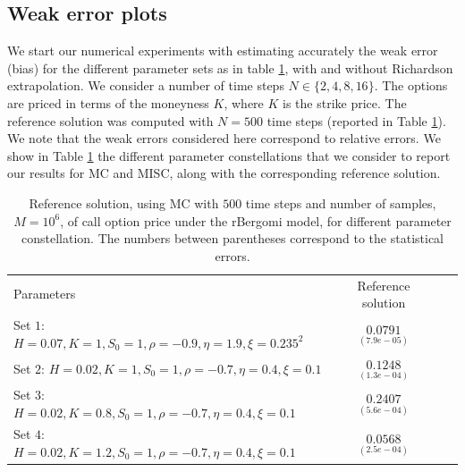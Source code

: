 
\subsection{Weak error plots} \label{sec:Weak error plots_no_change}

We start our numerical experiments with estimating accurately the weak error (bias)  for the different parameter sets as in table \ref{table:Reference solution, using MC with $500$ time steps, of Call option price under rBergomi model, for different parameter constellation.}, with and without Richardson extrapolation.  We consider a number of time steps $N \in \{2,4,8,16\}$. The options are priced in terms of the moneyness $K$, where $K$ is the strike price.  The reference solution was computed with $N=500$ time steps (reported in Table \ref{table:Reference solution, using MC with $500$ time steps, of Call option price under rBergomi model, for different parameter constellation.}). We note that the weak errors considered here correspond to relative errors. We show in Table \ref{table:Reference solution, using MC with $500$ time steps, of Call option price under rBergomi model, for different parameter constellation.} the different parameter constellations that we consider to report our results for MC and MISC, along with the corresponding reference solution.


\begin{table}[!h]
	\centering
	\begin{small}
	\begin{tabular}{l*{2}{c}r}
		Parameters            & Reference solution    \\

			Set $1$:	$H=0.07, K=1,S_0=1, \rho=-0.9, \eta=1.9,\xi=0.235^2$   & $\underset{(7.9e-05)}{0.0791}$  \\	

				Set $2$:	$H=0.02, K=1, S_0=1, \rho=-0.7, \eta=0.4,\xi=0.1$   & $\underset{(1.3e-04)}{0.1248}$  \\
					Set $3$:	$H=0.02, K=0.8,S_0=1, \rho=-0.7, \eta=0.4,\xi=0.1$   & $\underset{(5.6e-04)}{0.2407}$  \\
						Set $4$:	$H=0.02, K=1.2,S_0=1, \rho=-0.7, \eta=0.4,\xi=0.1$   & $\underset{(2.5e-04)}{0.0568}$  \\
		\hline
	\end{tabular}
\end{small}
	\caption{Reference solution, using MC with $500$ time steps and number of samples, $M=10^6$, of call option price under the rBergomi model, for different parameter constellation.  The numbers between parentheses correspond to the statistical errors.}
	\label{table:Reference solution, using MC with $500$ time steps, of Call option price under rBergomi model, for different parameter constellation.}
\end{table}





